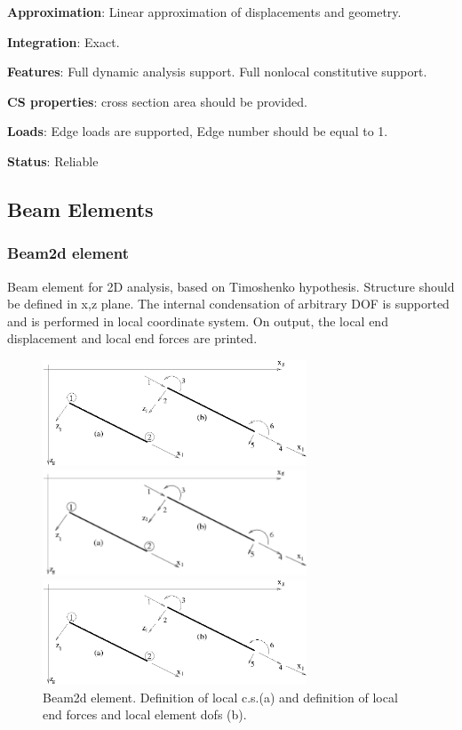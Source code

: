 \documentclass[a4paper]{article}
\newcommand{\descitem}[1]{{\noindent \bf #1}:}
\begin{document}
\descitem{Approximation} Linear approximation of displacements and geometry.

\descitem{Integration} Exact.

\descitem{Features} Full dynamic analysis support. Full nonlocal
constitutive support.

\descitem{CS properties} cross section area should be
provided.

\descitem{Loads} Edge loads are supported, Edge number should be equal
to 1.

\descitem{Status} Reliable

\subsection{Beam Elements}
\subsubsection{Beam2d element}
Beam element for 2D analysis, based on Timoshenko hypothesis. Structure should be defined in x,z
plane. The internal condensation
of arbitrary DOF is supported and is performed in local coordinate
system. On output, the local end displacement and local end forces are
printed. 

\begin{figure}[tb]
\begin{htmlonly}
  \centerline{\includegraphics[width=0.7\textwidth]{beam2d.eps}}
\end{htmlonly}
\ifpdf
\centerline{\includegraphics[width=0.7\textwidth]{beam2d.pdf}}
\else
\centerline{\includegraphics[width=0.7\textwidth]{beam2d.eps}}
\fi
\caption{Beam2d element. Definition of local c.s.(a)  and definition of
local end forces and local element dofs (b).}
\label{beam2dfig}
\end{figure}
\end{document}
